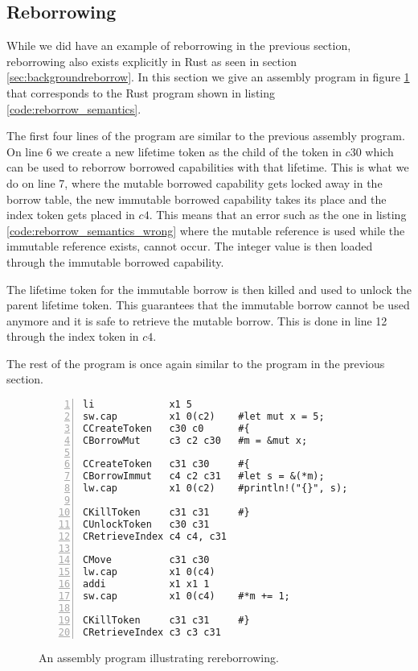 \subsection{Reborrowing}
While we did have an example of reborrowing in the previous section, reborrowing also exists explicitly in Rust as seen in section \ref{sec:backgroundreborrow}.
In this section we give an assembly program in figure \ref{fig:asmreborrowexample} that corresponds to the Rust program shown in listing \ref{code:reborrow_semantics}.

The first four lines of the program are similar to the previous assembly program.
On line 6 we create a new lifetime token as the child of the token in $c30$ which can be used to reborrow borrowed capabilities with that lifetime.
This is what we do on line 7, where the mutable borrowed capability gets locked away in the borrow table, the new immutable borrowed capability takes its place and the index token gets placed in $c4$.
This means that an error such as the one in listing \ref{code:reborrow_semantics_wrong} where the mutable reference is used while the immutable reference exists, cannot occur.
The integer value is then loaded through the immutable borrowed capability.

The lifetime token for the immutable borrow is then killed and used to unlock the parent lifetime token.
This guarantees that the immutable borrow cannot be used anymore and it is safe to retrieve the mutable borrow.
This is done in line 12 through the index token in $c4$.

The rest of the program is once again similar to the program in the previous section.
\begin{figure}[h]
\begin{lstlisting}[style=custASM, numbers = left ,xleftmargin=1.5em]
li             x1 5
sw.cap         x1 0(c2)    #let mut x = 5;
CCreateToken   c30 c0      #{
CBorrowMut     c3 c2 c30   #m = &mut x;

CCreateToken   c31 c30     #{
CBorrowImmut   c4 c2 c31   #let s = &(*m);
lw.cap         x1 0(c2)    #println!("{}", s);

CKillToken     c31 c31     #}
CUnlockToken   c30 c31
CRetrieveIndex c4 c4, c31

CMove          c31 c30
lw.cap         x1 0(c4)
addi           x1 x1 1
sw.cap         x1 0(c4)    #*m += 1;

CKillToken     c31 c31     #}
CRetrieveIndex c3 c3 c31
\end{lstlisting}
\caption{An assembly program illustrating rereborrowing.}
\label{fig:asmreborrowexample}
\end{figure}

